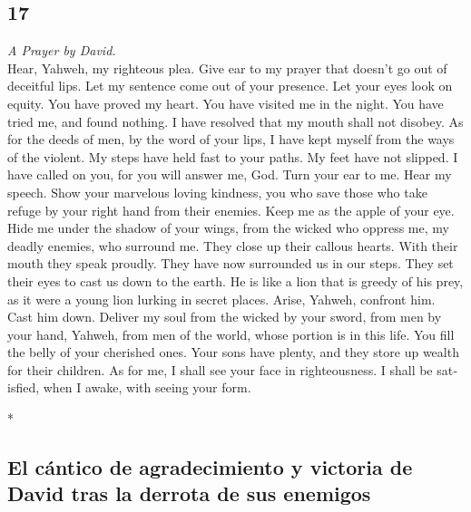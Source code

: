 \begin{paracol}{2}
\switchcolumn
\begin{otherlanguage}{english}

\hypertarget{section-33}{%
\section{17}\label{section-33}}

\emph{A Prayer by David.}\\
 Hear, Yahweh, my righteous plea. Give ear to my prayer
that doesn't go out of deceitful lips.  Let my sentence
come out of your presence. Let your eyes look on equity. 
You have proved my heart. You have visited me in the night. You have
tried me, and found nothing. I have resolved that my mouth shall not
disobey.  As for the deeds of men, by the word of your
lips, I have kept myself from the ways of the violent.  My
steps have held fast to your paths. My feet have not slipped.
 I have called on you, for you will answer me, God. Turn
your ear to me. Hear my speech.  Show your marvelous
loving kindness, you who save those who take refuge by your right hand
from their enemies.  Keep me as the apple of your eye.
Hide me under the shadow of your wings,  from the wicked
who oppress me, my deadly enemies, who surround me.  They
close up their callous hearts. With their mouth they speak proudly.
 They have now surrounded us in our steps. They set their
eyes to cast us down to the earth.  He is like a lion
that is greedy of his prey, as it were a young lion lurking in secret
places.  Arise, Yahweh, confront him. Cast him down.
Deliver my soul from the wicked by your sword,  from men
by your hand, Yahweh, from men of the world, whose portion is in this
life. You fill the belly of your cherished ones. Your sons have plenty,
and they store up wealth for their children.  As for me,
I shall see your face in righteousness. I shall be satisfied, when I
awake, with seeing your form.

\end{otherlanguage}

\switchcolumn[0]*

\hypertarget{el-cuxe1ntico-de-agradecimiento-y-victoria-de-david-tras-la-derrota-de-sus-enemigos}{%
\subsection{El cántico de agradecimiento y victoria de David tras la
derrota de sus
enemigos}\label{el-cuxe1ntico-de-agradecimiento-y-victoria-de-david-tras-la-derrota-de-sus-enemigos}}


\end{paracol}
